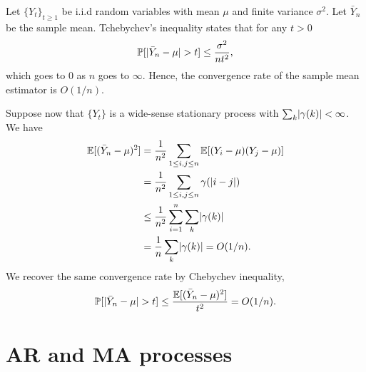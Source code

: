 \documentclass[11pt]{article}
\DeclarePairedDelimiter\abs{|}{|}
\begin{document}
\begin{solution}  %
    Let $\{Y_t\}_{t\geq 1}$ be i.i.d random variables with mean $\mu$ and finite variance $\sigma^2$. Let $\bar{Y}_n$ be the sample mean. Tchebychev's inequality states that for any $t>0$
    \begin{equation}
        \mathbb{P}[\abs{\bar{Y}_n- \mu}>t]\leq \frac{\sigma^2}{n t^2},
    \end{equation}
    which goes to $0$ as $n$ goes to $\infty$. Hence, the convergence rate of the sample mean estimator is $O(1/n)$.

    Suppose now that $\{Y_t\}$ is a wide-sense stationary process with $\sum_k \abs{\gamma (k)} < \infty$. We have
    \begin{equation}
        \begin{split}
            \mathbb{E}[(\bar{Y}_n-\mu)^2] & = \frac{1}{n^2} \sum_{1\leq i,j\leq n} \mathbb{E}[(Y_i-\mu) (Y_j-\mu)]\\
            & = \frac{1}{n^2} \sum_{1\leq i,j\leq n} \gamma(\abs{i-j})\\
            & \leq \frac{1}{n^2} \sum_{i=1}^{n}\sum_{k} \abs{\gamma(k)}\\
            & = \frac{1}{n} \sum_{k}\abs{\gamma(k)}  = O(1/n).
        \end{split}
    \end{equation}
    We recover the same convergence rate by Chebychev inequality,
    \begin{equation}
        \mathbb{P}[\abs{\bar{Y}_n-\mu}>t]\leq \frac{\mathbb{E}[(\bar{Y}_n-\mu)^2]}{t^2} = O(1/n).
    \end{equation}
\end{solution}


\newpage
\section{AR and MA processes}
\end{document}

